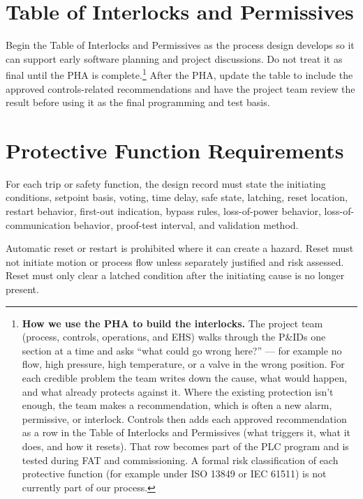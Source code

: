 \section{Table of Interlocks and Permissives}
Begin the Table of Interlocks and Permissives as the process design develops so it can support early software planning and project discussions. Do not treat it as final until the PHA is complete.\footnote{\textbf{How we use the PHA to build the interlocks.} The project team (process, controls, operations, and EHS) walks through the P\&IDs one section at a time and asks ``what could go wrong here?'' --- for example no flow, high pressure, high temperature, or a valve in the wrong position. For each credible problem the team writes down the cause, what would happen, and what already protects against it. Where the existing protection isn't enough, the team makes a recommendation, which is often a new alarm, permissive, or interlock. Controls then adds each approved recommendation as a row in the Table of Interlocks and Permissives (what triggers it, what it does, and how it resets). That row becomes part of the PLC program and is tested during FAT and commissioning. A formal risk classification of each protective function (for example under ISO 13849 or IEC 61511) is not currently part of our process.} After the PHA, update the table to include the approved controls-related recommendations and have the project team review the result before using it as the final programming and test basis.

\section{Protective Function Requirements}\label{sec:protective-function-reqs}

For each trip or safety function, the design record must state the initiating conditions, setpoint basis, voting, time delay, safe state, latching, reset location, restart behavior, first-out indication, bypass rules, loss-of-power behavior, loss-of-communication behavior, proof-test interval, and validation method.

Automatic reset or restart is prohibited where it can create a hazard. Reset must not initiate motion or process flow unless separately justified and risk assessed. Reset must only clear a latched condition after the initiating cause is no longer present.


